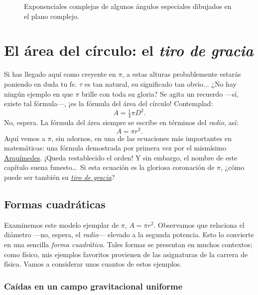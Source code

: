 \begin{figure}
\begin{center}
\end{center}
\caption{Exponenciales complejas de algunos ángulos especiales dibujados en el plano complejo.\label{fig:tau_euler_circle}}
\end{figure}


\section{El área del círculo: el \emph{tiro de gracia}} %
\label{sec:circular_area}

Si has llegado aquí como creyente en $\pi$, a estas alturas probablemente estarás poniendo en duda tu fe. $\tau$ es tan natural, su significado tan obvio... ¿No hay ningún ejemplo en que $\pi$ brille con toda su gloria? Se agita un recuerdo ---sí, existe tal fórmula---, ¡es la fórmula del área del círculo! Contemplad:
\[ A = \tfrac{1}{4} \pi D^2. \]
No, espera. La fórmula del área siempre se escribe en términos del \emph{radio}, así:
\[ A = \pi r^2. \]
Aquí vemos a $\pi$, sin adornos, en una de las ecuaciones más importantes en matemáticas: una fórmula demostrada por primera vez por el mismísimo \href{https://es.wikipedia.org/wiki/Arquímedes}{Arquímedes}. ¡Queda restablecido el orden! Y sin embargo, el nombre de este capítulo suena funesto\ldots\ Si esta ecuación es la gloriosa coronación de $\pi$, ¿cómo puede ser también su \href{https://es.wikipedia.org/wiki/Tiro_de_gracia}{\emph{tiro de gracia}}?


  \subsection{Formas cuadráticas} %
  \label{sec:quadratic_forms}

Examinemos este modelo ejemplar de $\pi$, $A = \pi r^2$. Observamos que relaciona el diámetro ---no, espera, el \emph{radio}--- elevado a la segunda potencia. Esto lo convierte en una sencilla \emph{forma cuadrática}. Tales formas se presentan en muchos contextos; como físico, mis ejemplos favoritos provienen de las asignaturas de la carrera de física. Vamos a considerar unos cuantos de estos ejemplos.

    \subsubsection{Caídas en un campo gravitacional uniforme} %
    \label{sec:falling_in_a_uniform_gravitational_field}

